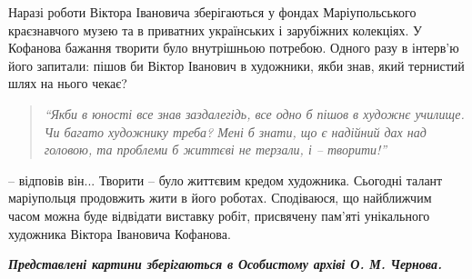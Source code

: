 
Наразі роботи Віктора Івановича зберігаються у фондах Маріупольського
краєзнавчого музею та в приватних українських і зарубіжних колекціях. У
Кофанова бажання творити було внутрішньою потребою. Одного разу в інтерв'ю його
запитали: пішов би Віктор Іванович в художники, якби знав, який тернистий шлях
на нього чекає? 

\begin{quote}
\em\enquote{Якби в юності все знав заздалегідь, все одно б пішов в художнє
училище. Чи багато художнику треба? Мені б знати, що є надійний дах над
головою, та проблеми б життєві не терзали, і – творити!} 
\end{quote}

– відповів він... Творити – було життєвим кредом художника. Сьогодні талант
маріупольця продовжить жити в його роботах. Сподіваюся, що найближчим часом
можна буде відвідати виставку робіт, присвячену пам'яті унікального художника
Віктора Івановича Кофанова.

\emph{\textbf{Представлені картини зберігаються в Особистому архіві О. М. Чернова.}}
